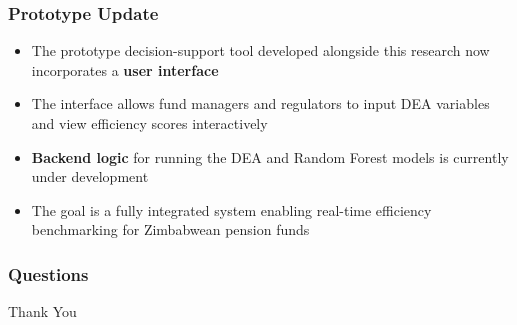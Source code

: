 \documentclass{beamer}
\begin{document}
\begin{frame}
    \frametitle{Prototype Update}
    \begin{itemize}
        \item The prototype decision-support tool developed alongside this research now incorporates a \textbf{user interface}
        \item The interface allows fund managers and regulators to input DEA variables and view efficiency scores interactively
        \item \textbf{Backend logic} for running the DEA and Random Forest models is currently under development
        \item The goal is a fully integrated system enabling real-time efficiency benchmarking for Zimbabwean pension funds
    \end{itemize}
\end{frame}

\begin{frame}
    \frametitle{Questions}
    \centering
    \Huge{Thank You}
\end{frame}
\end{document}
